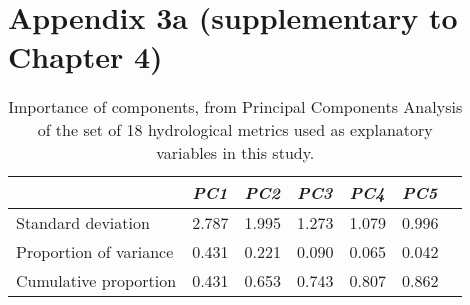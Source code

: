\chapter[Appendix 3a]{Appendix 3a (supplementary to Chapter 4)}

\begin{table}[ht]
\tiny
\centering
\caption[PCA of hydrological variables]{Importance of components, from Principal Components Analysis of the set of 18 hydrological metrics used as explanatory variables in this study.}
\label{Ch4sup_T1}
\begin{tabu} to 
\hline
                       &  \textit{PC1}   & \textit{PC2}   & \textit{PC3}   & \textit{PC4}   & \textit{PC5}  \\ \hline
Standard deviation     & 2.787 & 1.995 & 1.273 & 1.079 & 0.996 \\
Proportion of variance & 0.431 & 0.221 & 0.090 & 0.065 & 0.042 \\
Cumulative proportion  & 0.431 & 0.653 & 0.743 & 0.807 & 0.862 \\ \hline
\end{tabu}
\end{table}

